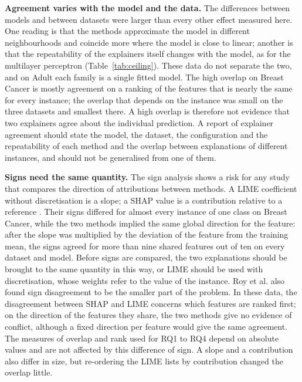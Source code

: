\documentclass{cys}
\begin{document}
\textbf{Agreement varies with the model and the data.} The differences between models and
between datasets were larger than every other effect measured here. One reading is that
the methods approximate the model in different neighbourhoods \cite{han2022which} and
coincide more where the model is close to linear; another is that the repeatability of
the explainers itself changes with the model, as for the multilayer perceptron
(Table~\ref{tab:ceiling}). These data do not separate the two, and on Adult each family is a single
fitted model. The high overlap on Breast Cancer is mostly agreement on a ranking of the
features that is nearly the same for every instance; the overlap that depends on the
instance was small on the three datasets and smallest there. A high overlap is therefore
not evidence that two explainers agree about the individual prediction. A report of
explainer agreement should state the model, the dataset, the configuration and the
repeatability of each method and the overlap between explanations of different instances,
and should not be generalised from one of them.

\textbf{Signs need the same quantity.} The sign analysis shows a risk for any study that
compares the direction of attributions between methods. A LIME coefficient without
discretisation is a slope; a SHAP value is a contribution relative to a reference
\cite{garreau2020explaining,lundberg2017unified}. Their signs differed for almost every
instance of one class on Breast Cancer, while the two methods implied the same global
direction for the feature: after the slope was multiplied by the deviation of the feature
from the training mean, the signs agreed for more than nine shared features out of ten on
every dataset and model. Before signs are compared, the two explanations should be brought
to the same quantity in this way, or LIME should be used with discretisation, whose
weights refer to the value of the instance. Roy et al. \cite{roy2022why} also found sign
disagreement to be the smaller part of the problem. In these data, the disagreement
between SHAP and LIME concerns which features are ranked first; on the direction of the
features they share, the two methods give no evidence of conflict, although a fixed
direction per feature would give the same agreement. The measures of overlap and rank used for RQ1 to RQ4 depend on absolute values and
are not affected by this difference of sign. A slope and a contribution also differ in
size, but re-ordering the LIME lists by contribution changed the overlap little.
\end{document}
